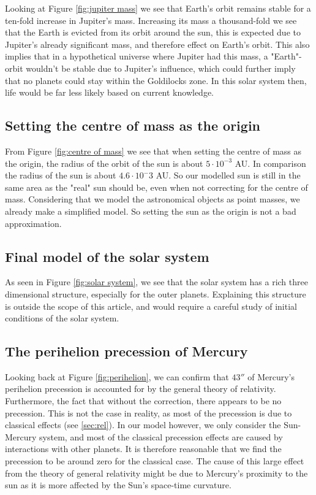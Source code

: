 Looking at Figure \ref{fig:jupiter mass} we see that Earth's orbit remains stable for a
ten-fold increase in Jupiter's mass. Increasing its mass a thousand-fold we see
that the Earth is evicted from its orbit around the sun, this is expected due to
Jupiter's already significant mass, and therefore effect on Earth's orbit. This also implies that in a hypothetical universe where Jupiter had this mass, a "Earth"-orbit wouldn't be stable due to Jupiter's influence, which could further imply that no planets could stay within the Goldilocks zone. In this solar system then, life would be far less likely based on current knowledge.

\subsection{Setting the centre of mass as the origin}
From Figure \ref{fig:centre of mass} we see that when setting the centre of mass as the origin, the radius of the orbit of the sun is about $5\cdot 10^{-3}$ AU. In comparison the radius of the sun is about $4.6\cdot 10^-{3}$ AU. So our modelled sun is still in the same area as the "real" sun should be, even when not correcting for the centre of mass. Considering that we model the astronomical objects as point masses, we already make a simplified model. So setting the sun as the origin is not a bad approximation. 

\subsection{Final model of the solar system}
As seen in Figure \ref{fig:solar system}, we see that the solar system has a rich
three dimensional structure, especially for the outer planets. Explaining this structure is outside the scope of this article, and would require a careful study of initial conditions of the solar system.


\subsection{The perihelion precession of Mercury}
Looking back at Figure \ref{fig:perihelion}, we can confirm that $43''$ of Mercury's perihelion
precession is accounted for by the general theory of relativity. Furthermore, the fact that without the correction, there
appears to be no precession. This is not the case in reality, as most of the precession is due to classical effects (see \ref{sec:rel}). In our model however, we only consider the Sun-Mercury system, and most of the classical precession effects are caused by interactions with other planets. It is therefore reasonable that we find the precession to be around zero for the classical case. The cause of this large effect from the theory of general relativity might be due to Mercury's proximity to the sun as it is more affected by the Sun's space-time curvature.

